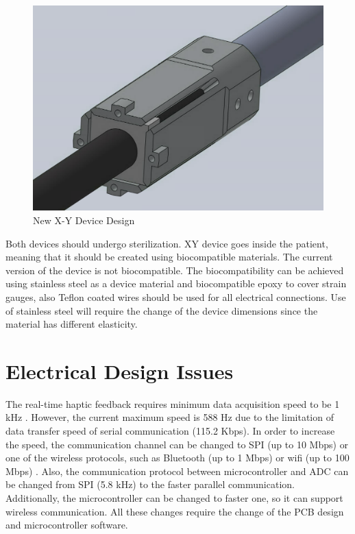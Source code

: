 \begin{figure}[h]
	\begin{center}
		\includegraphics[width=120mm]{fig/methods/new_xy_dev.png}
	\end{center}
	\vspace{-4mm}
	\caption[New X-Y Device Design]
	{New X-Y Device Design}
	\label{fig:NewXYDesign}
	\vspace{-2mm}
\end{figure}
	
	Both devices should undergo sterilization. XY device goes inside the patient, meaning that it should be created using biocompatible materials. The current version of the device is not biocompatible. The biocompatibility can be achieved using stainless steel as a device material and biocompatible epoxy to cover strain gauges, also Teflon coated wires should be used for all electrical connections. Use of stainless steel will require the change of the device dimensions since the material has different elasticity.
	
\section{Electrical Design Issues}
	The real-time haptic feedback requires minimum data acquisition speed to be 1 kHz \cite{seungmoon_choi_effect_2004}. However, the current maximum speed is 588 Hz due to the limitation of data transfer speed of serial communication (115.2 Kbps). In order to increase the speed, the communication channel can be changed to SPI (up to 10 Mbps) \cite{_uart_porotocol} or one of the wireless protocols, such as Bluetooth (up to 1 Mbps) or wifi (up to 100 Mbps) \cite{_wireless_protocols}. Also, the communication protocol between microcontroller and ADC can be changed from SPI (5.8 kHz) to the faster parallel communication. Additionally, the microcontroller can be changed to faster one, so it can support wireless communication. All these changes require the change of the PCB design and microcontroller software. 
	
